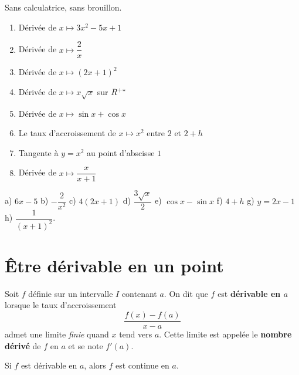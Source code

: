 \begin{automatismes}
Sans calculatrice, sans brouillon.

\begin{enumerate}[label=\textbf{\alph*)}, leftmargin=*, itemsep=0.25em]
  \item Dérivée de $x \mapsto 3x^{2}-5x+1$
  \item Dérivée de $x \mapsto \dfrac{2}{x}$
  \item Dérivée de $x \mapsto (2x+1)^{2}$
  \item Dérivée de $x \mapsto x\sqrt{x}$ sur $R^{+*}$
  \item Dérivée de $x \mapsto \sin x + \cos x$
  \item Le taux d'accroissement de $x \mapsto x^{2}$ entre $2$ et $2+h$
  \item Tangente à $y = x^{2}$ au point d'abscisse $1$
  \item Dérivée de $x \mapsto \dfrac{x}{x+1}$
\end{enumerate}
\end{automatismes}

\begin{corrige}[automatismes]
a) $6x-5$ \quad b) $-\dfrac{2}{x^{2}}$ \quad c) $4(2x+1)$ \quad
d) $\dfrac{3\sqrt{x}}{2}$ \quad e) $\cos x - \sin x$ \quad
f) $4+h$ \quad g) $y = 2x-1$ \quad h) $\dfrac{1}{(x+1)^{2}}$.
\end{corrige}

\section{Être dérivable en un point}

\begin{definition}
Soit $f$ définie sur un intervalle $I$ contenant $a$. On dit que $f$ est
\textbf{dérivable en $a$} lorsque le taux d'accroissement
\[
  \frac{f(x)-f(a)}{x-a}
\]
admet une limite \emph{finie} quand $x$ tend vers $a$. Cette limite est
appelée le \textbf{nombre dérivé} de $f$ en $a$ et se note $f'(a)$.
\end{definition}


\begin{propriete}
Si $f$ est dérivable en $a$, alors $f$ est continue en $a$.
\end{propriete}

